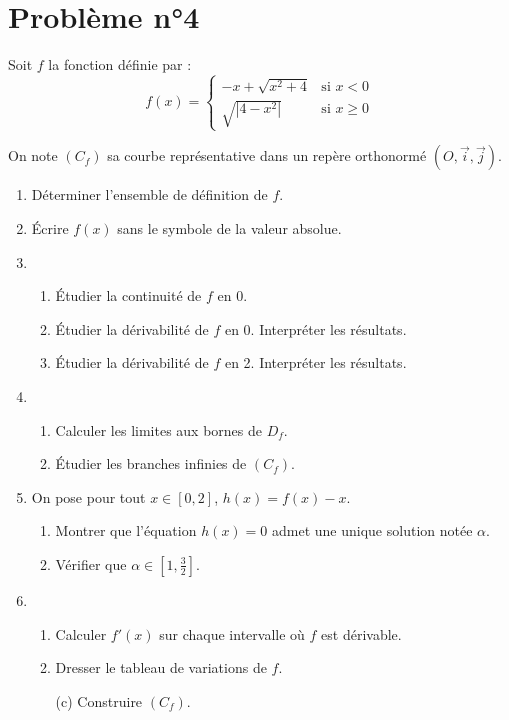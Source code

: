 \documentclass[12pt]{article}
\begin{document}
\section*{Problème n°4}
Soit $f$ la fonction définie par :
\[
f(x) =
\begin{cases}
-x + \sqrt{x^2 + 4} & \text{si } x < 0 \\
\sqrt{|4 - x^2|} & \text{si } x \geq 0
\end{cases}
\]

On note $(C_f)$ sa courbe représentative dans un repère orthonormé $(O, \vec{i}, \vec{j})$.

\begin{enumerate}
    \item Déterminer l’ensemble de définition de $f$.
    \item Écrire $f(x)$ sans le symbole de la valeur absolue.
    \item
    \begin{enumerate}
        \item Étudier la continuité de $f$ en 0.
        \item Étudier la dérivabilité de $f$ en 0. Interpréter les résultats.
        \item Étudier la dérivabilité de $f$ en 2. Interpréter les résultats.
    \end{enumerate}
    \item
    \begin{enumerate}
        \item Calculer les limites aux bornes de $D_f$.
        \item Étudier les branches infinies de $(C_f)$.
    \end{enumerate}
    \item On pose pour tout $x \in [0, 2]$, $h(x) = f(x) - x$.
    \begin{enumerate}
        \item Montrer que l’équation $h(x) = 0$ admet une unique solution notée $\alpha$.
        \item Vérifier que $\alpha \in \left[1, \frac{3}{2}\right]$.
    \end{enumerate}
    \item
    \begin{enumerate}
        \item Calculer $f'(x)$ sur chaque intervalle où $f$ est dérivable.
        \item Dresser le tableau de variations de $f$.
        \item[(c)] Construire $(C_f)$.

\end{enumerate}
\end{enumerate}
\end{document}
